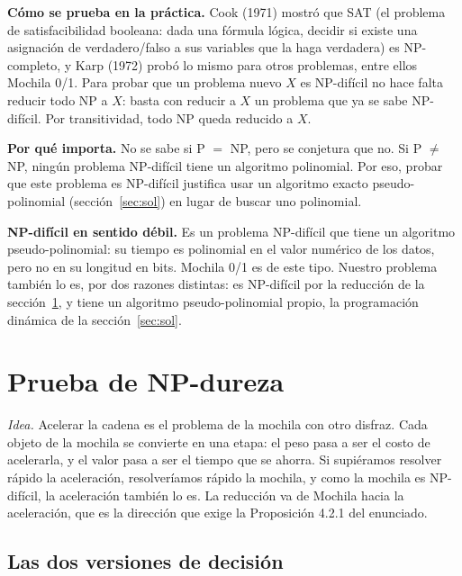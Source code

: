 \documentclass[11pt,a4paper]{article}
\theoremstyle{plano}
\begin{document}
\textbf{Cómo se prueba en la práctica.} Cook (1971) mostró que SAT (el problema de satisfacibilidad booleana: dada una fórmula lógica, decidir si existe una asignación de verdadero/falso a sus variables que la haga verdadera) es NP-completo, y Karp (1972) probó lo mismo para otros problemas, entre ellos Mochila 0/1. Para probar que un problema nuevo $X$ es NP-difícil no hace falta reducir todo NP a $X$: basta con reducir a $X$ un problema que ya se sabe NP-difícil. Por transitividad, todo NP queda reducido a $X$.

\textbf{Por qué importa.} No se sabe si P $=$ NP, pero se conjetura que no. Si P $\ne$ NP, ningún problema NP-difícil tiene un algoritmo polinomial. Por eso, probar que este problema es NP-difícil justifica usar un algoritmo exacto pseudo-polinomial (sección~\ref{sec:sol}) en lugar de buscar uno polinomial.

\textbf{NP-difícil en sentido débil.} Es un problema NP-difícil que tiene un algoritmo pseudo-polinomial: su tiempo es polinomial en el valor numérico de los datos, pero no en su longitud en bits. Mochila 0/1 es de este tipo. Nuestro problema también lo es, por dos razones distintas: es NP-difícil por la reducción de la sección~\ref{sec:np}, y tiene un algoritmo pseudo-polinomial propio, la programación dinámica de la sección~\ref{sec:sol}.

\section{Prueba de NP-dureza}
\label{sec:np}

\textit{Idea.} Acelerar la cadena es el problema de la mochila con otro disfraz. Cada objeto de la mochila se convierte en una etapa: el peso pasa a ser el costo de acelerarla, y el valor pasa a ser el tiempo que se ahorra. Si supiéramos resolver rápido la aceleración, resolveríamos rápido la mochila, y como la mochila es NP-difícil, la aceleración también lo es. La reducción va de Mochila hacia la aceleración, que es la dirección que exige la Proposición 4.2.1 del enunciado.

\subsection{Las dos versiones de decisión}
\end{document}
